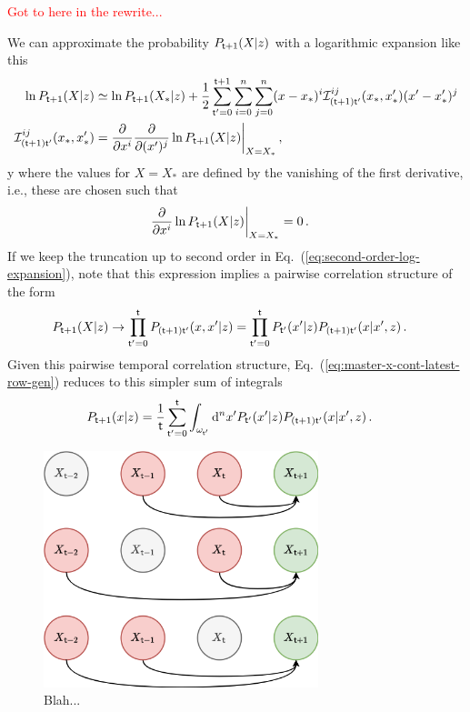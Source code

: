 \textcolor{red}{Got to here in the rewrite...}

We can approximate the probability $P_{{\sf t}+1}(X\vert z)$ with a logarithmic expansion like this
\begin{align}
\ln P_{{\sf t}+1}(X\vert z) &\simeq \ln P_{{\sf t}+1}(X_*\vert z) + \frac{1}{2}\sum_{{\sf t}'=0}^{{\sf t}+1}\sum_{i=0}^{n}\sum_{j=0}^{n} (x-x_*)^i {\cal I}^{ij}_{({\sf t}+1){\sf t}'}(x_*,x'_*) (x'-x'_*)^j \label{eq:second-order-log-expansion} \\
{\cal I}^{ij}_{({\sf t}+1){\sf t}'}(x_*,x'_*) &= \frac{\partial}{\partial x^i}\frac{\partial}{\partial (x')^j}\ln P_{{\sf t}+1}(X\vert z) \bigg\vert_{X=X_*} \,,
\end{align}y
where the values for $X=X_*$ are defined by the vanishing of the first derivative, i.e., these are chosen such that
\begin{align}
\frac{\partial}{\partial x^i}\ln P_{{\sf t}+1}(X\vert z) \bigg\vert_{X=X_*} &= 0 \,.
\end{align}
If we keep the truncation up to second order in Eq.~(\ref{eq:second-order-log-expansion}), note that this expression implies a pairwise correlation structure of the form
\begin{align}
P_{{\sf t}+1}(X\vert z) &\rightarrow \prod_{{\sf t}'=0}^{{\sf t}}P_{({\sf t}+1){\sf t}'}(x,x'\vert z) = \prod_{{\sf t}'=0}^{{\sf t}}P_{{\sf t}'}(x'\vert z)P_{({\sf t}+1){\sf t}'}(x\vert x', z) \,.
\end{align}
Given this pairwise temporal correlation structure, Eq.~(\ref{eq:master-x-cont-latest-row-gen}) reduces to this simpler sum of integrals
\begin{align}
P_{{\sf t}+1}(x\vert z) &= \frac{1}{{\sf t}}\sum_{{\sf t}'=0}^{{\sf t}}\int_{\omega_{{\sf t}'}}{\rm d}^nx' P_{{\sf t}'}(x'\vert z)P_{({\sf t}+1){\sf t}'}(x\vert x',z) \label{eq:second-order-correl} \,.
\end{align}

\begin{figure}[h]
\centering
\includegraphics[width=8cm]{images/chapter-2-second-temporal-correlation.drawio.png}
\caption{Blah...}
\label{fig:second-temporal-correlation}
\end{figure} 


